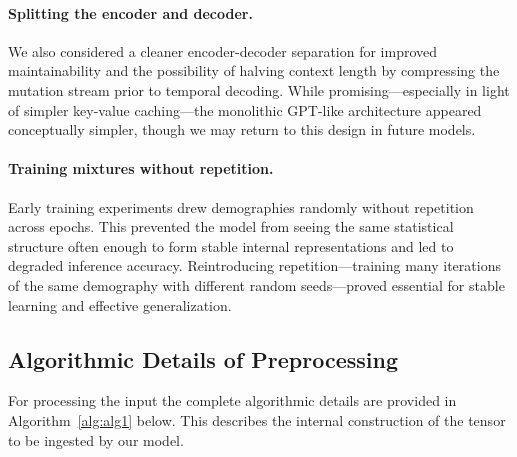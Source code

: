 \documentclass[9pt,twoside]{pnas-new}
\begin{document}
\paragraph{Splitting the encoder and decoder.}
We also considered a cleaner encoder-decoder separation for improved
maintainability and the possibility of halving context length by compressing
the mutation stream prior to temporal decoding. While promising---especially in
light of simpler key-value caching---the monolithic GPT-like architecture appeared conceptually simpler, though we may return to this design in future models.

\paragraph{Training mixtures without repetition.}
Early training experiments drew demographies randomly without repetition across
epochs. This prevented the model from seeing the same statistical structure
often enough to form stable internal representations and led to degraded
inference accuracy. Reintroducing repetition---training many iterations of the
same demography with different random seeds---proved essential for stable
learning and effective generalization.


\subsection*{Algorithmic Details of Preprocessing}
For processing the input the complete algorithmic details are  provided in Algorithm~\ref{alg:alg1} below.
This describes the internal construction of the tensor to be ingested by our model.
\end{document}
